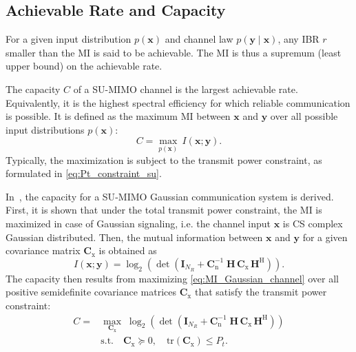 \subsection{Achievable Rate and Capacity}

For a given input distribution $p(\mathbf{x})$ and channel law $p(\mathbf{y}\mid\mathbf{x})$, any \ac{IBR} $r$ smaller than the \ac{MI} is said to be achievable. The \ac{MI} is thus a supremum (least upper bound) on the achievable rate.

The capacity $C$ of a \ac{SU}-\ac{MIMO} channel is the largest achievable rate. Equivalently, it is the highest spectral efficiency for which reliable communication is possible. It is defined as the maximum \ac{MI} between $\mathbf{x}$ and $\mathbf{y}$ over all possible input distributions $p(\mathbf{x})$:
\begin{equation}
    C = \max_{p(\mathbf{x})} \, I(\mathbf{x};\mathbf{y}).
\label{eq:capacity}
\end{equation}
Typically, the maximization is subject to the transmit power constraint, as formulated in \eqref{eq:Pt_constraint_su}.

In~\cite{telatar_1999}, the capacity for a \ac{SU}-\ac{MIMO} Gaussian communication system is derived. First, it is shown that under the total transmit power constraint, the \ac{MI} is maximized in case of Gaussian signaling, i.e. the channel input $\mathbf{x}$ is \ac{CS} complex Gaussian distributed. Then, the mutual information between $\mathbf{x}$ and $\mathbf{y}$ for a given covariance matrix $\mathbf{C}_{\mathrm{x}}$ is obtained as
\begin{equation}
    I(\mathbf{x};\mathbf{y})
    = \log_2\left(\det\left(\mathbf{I}_{N_R} +  \mathbf{C}_{\mathrm{n}}^{-1} \; \mathbf{H}\,\mathbf{C}_{\mathrm{x}}\,\mathbf{H}^\mathrm{H} \right)\right).
\label{eq:MI_Gaussian_channel}
\end{equation}
The capacity then results from maximizing \eqref{eq:MI_Gaussian_channel} over all positive semidefinite covariance matrices $\mathbf{C}_{\mathrm{x}}$ that satisfy the transmit power constraint:
\begin{equation}
\begin{aligned}
    C =& \max_{\mathbf{C}_{\mathrm{x}}} \; \log_2\left(\det\left(\mathbf{I}_{N_R} + \mathbf{C}_{\mathrm{n}}^{-1} \; \mathbf{H}\,\mathbf{C}_{\mathrm{x}}\,\mathbf{H}^\mathrm{H} \right)\right) \\
    &\text{s.t.} \quad \mathbf{C}_{\mathrm{x}} \succeq 0, \quad \mathrm{tr}\!\left(\mathbf{C}_{\mathrm{x}}\right) \leq P_t.
\end{aligned}
\label{eq:capacity_Gaussian_channel}
\end{equation}

